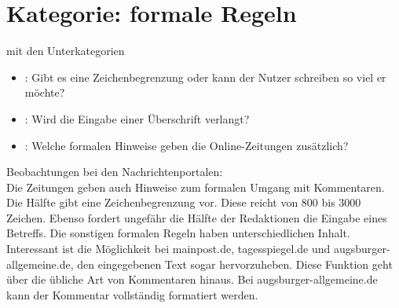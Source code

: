 \section{Kategorie: \glqq formale Regeln\grqq}

mit den Unterkategorien
\begin{itemize}
  \item{}\grqq: Gibt es eine Zeichenbegrenzung oder kann der Nutzer schreiben so viel
    er möchte?

  \item{}\grqq: Wird die Eingabe einer Überschrift verlangt?

  \item{}\grqq: Welche formalen Hinweise geben die Online-Zeitungen zusätzlich?
\end{itemize}

Beobachtungen bei den Nachrichtenportalen:\\
Die Zeitungen geben auch Hinweise zum formalen Umgang mit Kommentaren. Die Hälfte gibt eine Zeichenbegrenzung vor. Diese
reicht von 800 bis 3000 Zeichen.  Ebenso fordert ungefähr die Hälfte der Redaktionen die Eingabe eines Betreffs. Die
sonstigen formalen Regeln haben unterschiedlichen Inhalt. Interessant ist die Möglichkeit bei mainpost.de,
tagesspiegel.de und augsburger-allgemeine.de, den eingegebenen Text sogar hervorzuheben. Diese Funktion geht über die
übliche Art von Kommentaren hinaus. Bei augsburger-allgemeine.de kann der Kommentar vollständig formatiert werden.


